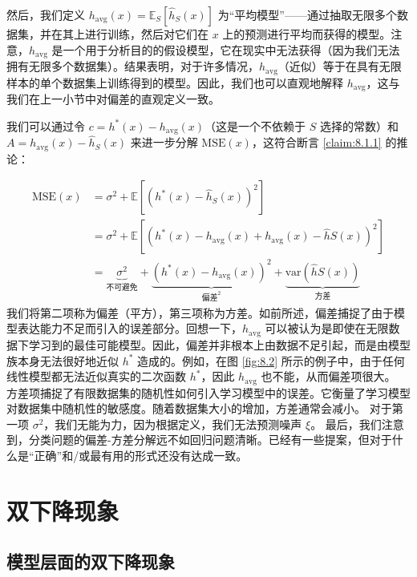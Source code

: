 然后，我们定义 $h_{\text{avg}}(x) = \mathbb{E}_S[\hat{h}_S(x)]$ 为“平均模型”——通过抽取无限多个数据集，并在其上进行训练，然后对它们在 $x$ 上的预测进行平均而获得的模型。注意，$h_{\text{avg}}$ 是一个用于分析目的的假设模型，它在现实中无法获得（因为我们无法拥有无限多个数据集）。结果表明，对于许多情况，$h_{\text{avg}}$（近似）等于在具有无限样本的单个数据集上训练得到的模型。因此，我们也可以直观地解释 $h_{\text{avg}}$，这与我们在上一小节中对偏差的直观定义一致。

我们可以通过令 $c = h^*(x) - h_{\text{avg}}(x)$（这是一个不依赖于 $S$ 选择的常数）和 $A = h_{\text{avg}}(x) - \hat{h}_S(x)$ 来进一步分解 $\text{MSE}(x)$，这符合断言 \ref{claim:8.1.1} 的推论：

\begin{align}
    \text{MSE}(x) &= \sigma^2 + \mathbb{E}[(h^*(x) - \hat{h}_S(x))^2] \label{eq:8.5} \\
    &= \sigma^2 + \mathbb{E}[(h^*(x) - h_{\text{avg}}(x) + h_{\text{avg}}(x) - \hat{h}S(x))^2] \label{eq:8.6} \\
    &= \underbrace{\sigma^2}_{\text{不可避免}} + \underbrace{(h^*(x) - h_{\text{avg}}(x))^2}_{\text{偏差}^2} + \underbrace{\text{var}(\hat{h}S(x))}_{\text{方差}} \label{eq:8.7}
\end{align}
我们将第二项称为偏差（平方），第三项称为方差。如前所述，偏差捕捉了由于模型表达能力不足而引入的误差部分。回想一下，$h_{\text{avg}}$ 可以被认为是即使在无限数据下学习到的最佳可能模型。因此，偏差并非根本上由数据不足引起，而是由模型族本身无法很好地近似 $h^*$ 造成的。例如，在图 \ref{fig:8.2} 所示的例子中，由于任何线性模型都无法近似真实的二次函数 $h^*$，因此 $h_{\text{avg}}$ 也不能，从而偏差项很大。
方差项捕捉了有限数据集的随机性如何引入学习模型中的误差。它衡量了学习模型对数据集中随机性的敏感度。随着数据集大小的增加，方差通常会减小。
对于第一项 $\sigma^2$，我们无能为力，因为根据定义，我们无法预测噪声 $\xi$。
最后，我们注意到，分类问题的偏差-方差分解远不如回归问题清晰。已经有一些提案，但对于什么是“正确”和/或最有用的形式还没有达成一致。


\section{双下降现象}\label{sec:8.2}

\subsection*{模型层面的双下降现象}

